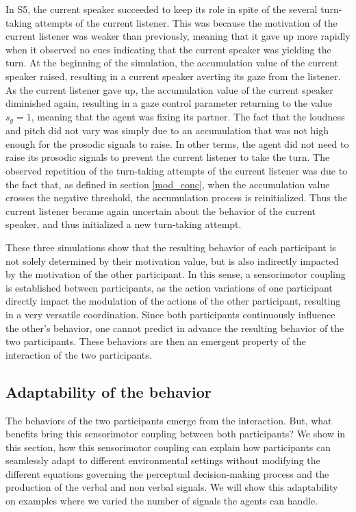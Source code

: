 In S5, the current speaker succeeded to keep its role in spite of the several turn-taking attempts of the current listener. This was because the motivation of the current listener was weaker than previously, meaning that it gave up more rapidly when it observed no cues indicating that the current speaker was yielding the turn. At the beginning of the simulation, the accumulation value of the current speaker raised, resulting in a current speaker averting its gaze from the listener. As the current listener gave up, the accumulation value of the current speaker diminished again, resulting in a gaze control parameter returning to the value $s_g=1$, meaning that the agent was fixing its partner. The fact that the loudness and pitch did not vary was simply due to an accumulation that was not high enough for the prosodic signals to raise. In other terms, the agent did not need to raise its prosodic signals to prevent the current listener to take the turn. The observed repetition of the turn-taking attempts of the current listener was due to the fact that, as defined in section \ref{mod_conc}, when the accumulation value crosses the negative threshold, the accumulation process is reinitialized. Thus the current listener became again uncertain about the behavior of the current speaker, and thus initialized a new turn-taking attempt. 


These three simulations show that the resulting behavior of each participant is not solely determined by their motivation value, but is also indirectly impacted by the motivation of the other participant. In this sense, a sensorimotor coupling is established between participants, as the action variations of one participant directly impact the modulation of the actions of the other participant, resulting in a very versatile coordination. Since both participants continuously influence the other's behavior, one cannot predict in advance the resulting behavior of the two participants. These behaviors are then an emergent property of the interaction of the two participants. 

\subsection{Adaptability of the behavior}

The behaviors of the two participants emerge from the interaction. But, what benefits bring this sensorimotor coupling between both participants?
We show in this section, how this sensorimotor coupling can explain how participants can seamlessly adapt to different environmental settings without modifying the different equations governing the perceptual decision-making process and the production of the verbal and non verbal signals. We will show this adaptability on examples where we varied the number of signals the agents can handle. 

